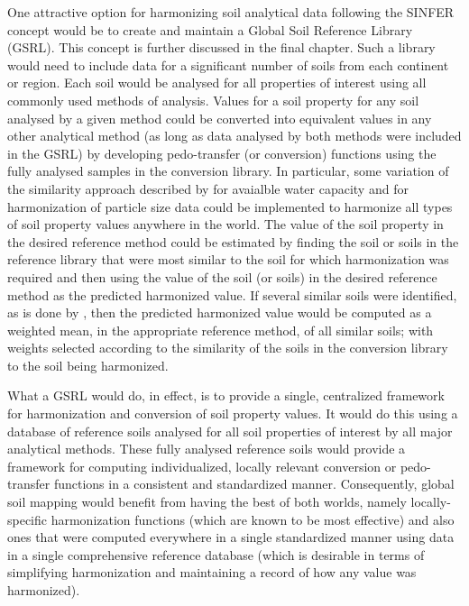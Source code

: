\documentclass[graybox,natbib,nospthms,UStrade]{svmono}
\begin{document}
One attractive option for harmonizing soil analytical data following the
SINFER concept would be to create and maintain a Global Soil Reference
Library (GSRL). This concept is further discussed in the final chapter.
Such a library would need to include data for a significant number of
soils from each continent or region. Each soil would be analysed for all
properties of interest using all commonly used methods of analysis.
Values for a soil property for any soil analysed by a given method could
be converted into equivalent values in any other analytical method (as
long as data analysed by both methods were included in the GSRL) by
developing pedo-transfer (or conversion) functions using the fully
analysed samples in the conversion library. In particular, some
variation of the similarity approach described by \citet{Jagtap2004TASAE} for
avaialble water capacity and \citet{Nemes1999G} for harmonization
of particle size data could be implemented to harmonize all types of
soil property values anywhere in the world. The value of the soil
property in the desired reference method could be estimated by finding
the soil or soils in the reference library that were most similar to the
soil for which harmonization was required and then using the value of
the soil (or soils) in the desired reference method as the predicted
harmonized value. If several similar soils were identified, as is done
by \citet{Nemes1999G}, then the predicted harmonized value would
be computed as a weighted mean, in the appropriate reference method,
of all similar soils; with weights selected according to the similarity
of the soils in the conversion library to the soil being harmonized.

What a GSRL would do, in effect, is to provide a single, centralized
framework for harmonization and conversion of soil property values. It
would do this using a database of reference soils analysed for all soil
properties of interest by all major analytical methods. These fully
analysed reference soils would provide a framework for computing
individualized, locally relevant conversion or pedo-transfer functions
in a consistent and standardized manner. Consequently, global soil
mapping would benefit from having the best of both worlds, namely
locally-specific harmonization functions (which are known to be most
effective) and also ones that were computed everywhere in a single
standardized manner using data in a single comprehensive reference
database (which is desirable in terms of simplifying harmonization and
maintaining a record of how any value was harmonized).
\end{document}
